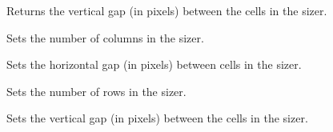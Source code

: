 
Returns the vertical gap (in pixels) between the cells in the sizer.


\label{wxgridsizersetcols}


Sets the number of columns in the sizer.


\label{wxgridsizersethgap}


Sets the horizontal gap (in pixels) between cells in the sizer.


\label{wxgridsizersetrows}


Sets the number of rows in the sizer.


\label{wxgridsizersetvgap}


Sets the vertical gap (in pixels) between the cells in the sizer.




